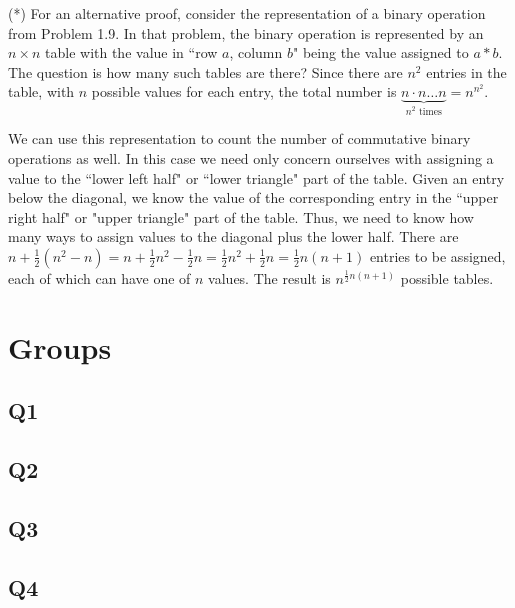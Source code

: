 \documentclass[12pt]{article}
\numberwithin{theorem}{section}
\numberwithin{equation}{section}
\numberwithin{remark}{section}
\numberwithin{definition}{section}
\numberwithin{theorem}{section}
\numberwithin{lemma}{section}
\numberwithin{example}{section}
\begin{document}
\vspace{\baselineskip}

\noindent (*) For an alternative proof, consider the representation of a binary operation from Problem 1.9. In that problem, the binary operation is represented by an $n\times n$ table with the value in ``row $a$, column $b$" being the value assigned to $a * b$. The question is how many such tables are there? Since there are $n^2$ entries in the table, with $n$ possible values for each entry, the total number is $\underbrace{n\cdot n \ldots n}_{n^2\text{ times}}=n^{n^2}$.

\vspace{\baselineskip}

\noindent We can use this representation to count the number of commutative binary operations as well. In this case we need only concern ourselves with assigning a value to the ``lower left half" or ``lower triangle" part of the table. Given an entry below the diagonal, we know the value of the corresponding entry in the ``upper right half" or "upper triangle" part of the table. Thus, we need to know how many ways to assign values to the diagonal plus the lower half. There are $n + \frac{1}{2}(n^2-n) = n + \frac{1}{2}n^2 - \frac{1}{2}n = \frac{1}{2}n^2+\frac{1}{2}n = \frac{1}{2}n(n+1)$ entries to be assigned, each of which can have one of $n$ values. The result is $n^{\frac{1}{2}n(n+1)}$ possible tables. 



\newpage

\section{Groups}

\subsection{Q1}

\subsection{Q2}

\subsection{Q3}

\subsection{Q4}
\end{document}
